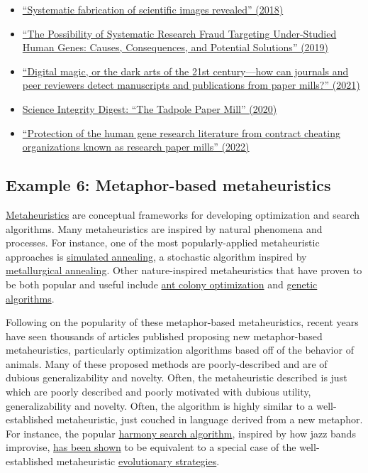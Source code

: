 \documentclass[letterpaper, 12pt]{article}
\begin{document}
\begin{itemize}
    \setlength\itemsep{-0.5em}
    \item \href{https://doi.org/10.1002/1873-3468.13201}{``Systematic fabrication of scientific images revealed'' (2018)}
    \item \href{https://doi.org/10.1177/1177271919829162}{``The Possibility of Systematic Research Fraud Targeting Under-Studied Human Genes: Causes, Consequences, and Potential Solutions'' (2019)}
    \item \href{https://doi.org/10.1002/1873-3468.13747}{``Digital magic, or the dark arts of the 21st century—how can journals and peer reviewers detect manuscripts and publications from paper mills?'' (2021)}
    \item \href{https://scienceintegritydigest.com/2020/02/21/the-tadpole-paper-mill/}{Science Integrity Digest: ``The Tadpole Paper Mill'' (2020)}
    \item \href{https://doi.org/10.1093/nar/gkac1139}{``Protection of the human gene research literature from contract cheating organizations known as research paper mills'' (2022)}

\end{itemize}

\subsection*{Example 6: Metaphor-based metaheuristics}

\href{https://en.wikipedia.org/wiki/Metaheuristic}{Metaheuristics} are conceptual frameworks for developing optimization and search algorithms. Many metaheuristics are inspired by natural phenomena and processes. For instance, one of the most popularly-applied metaheuristic approaches is \href{https://en.wikipedia.org/wiki/Simulated_annealing}{simulated annealing}, a stochastic algorithm inspired by \href{https://en.wikipedia.org/wiki/Annealing_(materials_science)}{metallurgical annealing}. Other nature-inspired metaheuristics that have proven to be both popular and useful include \href{https://en.wikipedia.org/wiki/Ant_colony_optimization_algorithms}{ant colony optimization} and \href{https://en.wikipedia.org/wiki/Genetic_algorithm}{genetic algorithms}.

Following on the popularity of these metaphor-based metaheuristics, recent years have seen thousands of articles published proposing new metaphor-based metaheuristics, particularly optimization algorithms based off of the behavior of animals. Many of these proposed methods are poorly-described and are of dubious generalizability and novelty. Often, the metaheuristic described is just which are poorly described and poorly motivated with dubious utility, generalizability and novelty. Often, the algorithm is highly similar to a well-established metaheuristic, just couched in language derived from a new metaphor. For instance, the popular \href{https://doi.org/10.1177/003754970107600201}{harmony search algorithm}, inspired by how jazz bands improvise, \href{https://doi.org/10.4018/978-1-4666-0270-0.ch005}{has been shown} to be equivalent to a special case of the well-established metaheuristic \href{https://en.wikipedia.org/wiki/Evolution_strategy}{evolutionary strategies}.
\end{document}
